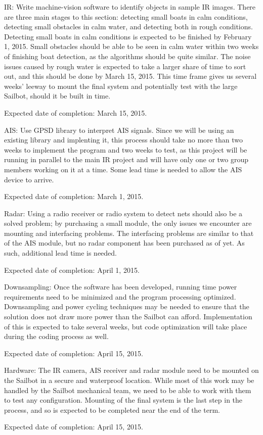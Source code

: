 IR:
Write machine-vision software to identify objects in sample IR images. There are three main stages to this section: detecting small boats in calm conditions, detecting small obstacles in calm water, and detecting both in rough conditions. Detecting small boats in calm conditions is expected to be finished by February 1, 2015. Small obstacles should be able to be seen in calm water within two weeks of finishing boat detection, as the algorithms should be quite similar. The noise issues caused by rough water is expected to take a larger share of time to sort out, and this should be done by March 15, 2015. This time frame gives us several weeks' leeway to mount the final system and potentially test with the large Sailbot, should it be built in time.

Expected date of completion: March 15, 2015. 


AIS:
Use GPSD library to interpret AIS signals. Since we will be using an existing library and implenting it, this process should take no more than two weeks to implement the program and two weeks to test, as this project will be running in parallel to the main IR project and will have only one or two group members working on it at a time. Some lead time is needed to allow the AIS device to arrive.

Expected date of completion: March 1, 2015.


Radar:
Using a radio receiver or radio system to detect nets should also be a solved problem; by purchasing a small module, the only issues we encounter are mounting and interfacing problems. The interfacing problems are similar to that of the AIS module, but no radar component has been purchased as of yet. As such, additional lead time is needed.

Expected date of completion: April 1, 2015.


Downsampling:
Once the software has been developed, running time power requirements need to be minimized and the program processing optimized. Downsampling and power cycling techniques may be needed to ensure that the solution does not draw more power than the Sailbot can afford. Implementation of this is expected to take several weeks, but code optimization will take place during the coding process as well.

Expected date of completion: April 15, 2015.


Hardware:
The IR camera, AIS receiver and radar module need to be mounted on the Sailbot in a secure and waterproof location. While most of this work may be handled by the Sailbot mechanical team, we need to be able to work with them to test any configuration. Mounting of the final system is the last step in the process, and so is expected to be completed near the end of the term.

Expected date of completion: April 15, 2015.

